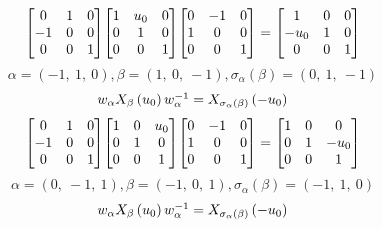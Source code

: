 \documentclass[11pt]{article}
\theoremstyle{definition}
\begin{document}
\[
\scaletoalign{\textwidth}{{\left[\begin{matrix}0 & 1 & 0\\-1 & 0 & 0\\0 & 0 & 1\end{matrix}\right]} {\left[\begin{matrix}1 & u_{0} & 0\\0 & 1 & 0\\0 & 0 & 1\end{matrix}\right]} {\left[\begin{matrix}0 & -1 & 0\\1 & 0 & 0\\0 & 0 & 1\end{matrix}\right]} = {\left[\begin{matrix}1 & 0 & 0\\- u_{0} & 1 & 0\\0 & 0 & 1\end{matrix}\right]}}
\]
\[
\alpha = \left( -1, \  1, \  0\right), \beta = \left( 1, \  0, \  -1\right), \sigma_{\alpha}(\beta) = \left( 0, \  1, \  -1\right)
\]
\[
\scaletoalign{\textwidth}{w_{\alpha} X_{\beta}\left(u_{0}\right) w_{\alpha}^{-1} = X_{\sigma_{\alpha}\left(\beta\right)}\left(- u_{0}\right)}
\]
\[
\scaletoalign{\textwidth}{{\left[\begin{matrix}0 & 1 & 0\\-1 & 0 & 0\\0 & 0 & 1\end{matrix}\right]} {\left[\begin{matrix}1 & 0 & u_{0}\\0 & 1 & 0\\0 & 0 & 1\end{matrix}\right]} {\left[\begin{matrix}0 & -1 & 0\\1 & 0 & 0\\0 & 0 & 1\end{matrix}\right]} = {\left[\begin{matrix}1 & 0 & 0\\0 & 1 & - u_{0}\\0 & 0 & 1\end{matrix}\right]}}
\]
\[
\alpha = \left( 0, \  -1, \  1\right), \beta = \left( -1, \  0, \  1\right), \sigma_{\alpha}(\beta) = \left( -1, \  1, \  0\right)
\]
\[
\scaletoalign{\textwidth}{w_{\alpha} X_{\beta}\left(u_{0}\right) w_{\alpha}^{-1} = X_{\sigma_{\alpha}\left(\beta\right)}\left(- u_{0}\right)}
\]
\end{document}
